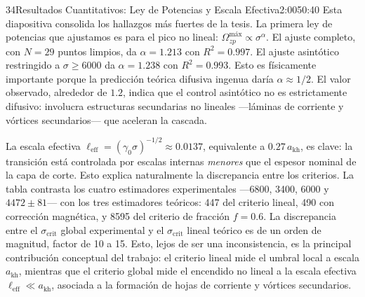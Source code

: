\documentclass[11pt,a4paper]{article}
\begin{document}
\begin{seborador}{34}{Resultados Cuantitativos: Ley de Potencias y Escala Efectiva}{2:00}{50:40}
Esta diapositiva consolida los hallazgos más fuertes de la tesis. La primera
ley de potencias que ajustamos es para el pico no lineal:
$\Omega^\text{máx}_{zp}\propto\sigma^\alpha$. El ajuste completo, con $N=29$
puntos limpios, da $\alpha=1.213$ con $R^2=0.997$. El ajuste asintótico
restringido a $\sigma\geq 6000$ da $\alpha=1.238$ con $R^2=0.993$. Esto es
físicamente importante porque la predicción teórica difusiva ingenua daría
$\alpha\approx 1/2$. El valor observado, alrededor de $1.2$, indica que el
control asintótico no es estrictamente difusivo: involucra estructuras
secundarias no lineales ---láminas de corriente y vórtices secundarios---
que aceleran la cascada.

La escala efectiva $\ell_\text{eff}=(\gamma_0\sigma)^{-1/2}\approx 0.0137$,
equivalente a $0.27\,a_\text{kh}$, es clave: la transición está controlada
por escalas internas \emph{menores} que el espesor nominal de la capa de
corte. Esto explica naturalmente la discrepancia entre los criterios. La
tabla contrasta los cuatro estimadores experimentales ---6800, 3400, 6000 y
$4472\pm 81$--- con los tres estimadores teóricos: 447 del criterio lineal,
490 con corrección magnética, y 8595 del criterio de fracción $f=0.6$. La
discrepancia entre el $\sigma_\text{crit}$ global experimental y el
$\sigma_\text{crit}$ lineal teórico es de un orden de magnitud, factor de 10
a 15. Esto, lejos de ser una inconsistencia, es la principal contribución
conceptual del trabajo: el criterio lineal mide el umbral local a escala
$a_\text{kh}$, mientras que el criterio global mide el encendido no lineal a
la escala efectiva $\ell_\text{eff}\ll a_\text{kh}$, asociada a la formación
de hojas de corriente y vórtices secundarios.
\end{seborador}
\end{document}
